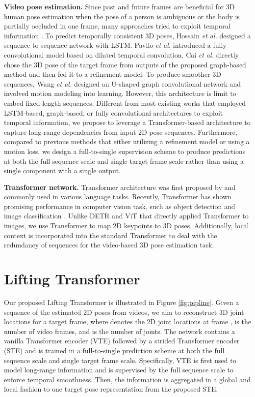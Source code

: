 \documentclass[10pt,twocolumn,letterpaper]{article}
\begin{document}
\textbf{Video pose estimation. }
Since past and future frames are beneficial for 3D human pose estimation when the pose of a person is ambiguous or the body is partially occluded in one frame, many approaches tried to exploit temporal information \cite{rayat2018exploiting,pavllo20193d,cai2019exploiting,wang2020motion}. 
To predict temporally consistent 3D poses, Hossain \emph{et al.} \cite{rayat2018exploiting} designed a sequence-to-sequence network with LSTM. 
Pavllo \emph{et al.} \cite{pavllo20193d} introduced a fully convolutional model based on dilated temporal convolution. 
Cai \emph{et al.} \cite{cai2019exploiting} directly chose the 3D pose of the target frame from outputs of the proposed graph-based method and then fed it to a refinement model. 
To produce smoother 3D sequences, Wang \emph{et al.} \cite{wang2020motion} designed an U-shaped graph convolutional network and involved motion modeling into learning. 
However, this architecture is limit to embed fixed-length sequences. 
Different from most existing works that employed LSTM-based, graph-based, or fully convolutional architectures to exploit temporal information, we propose to leverage a Transformer-based architecture to capture long-range dependencies from input 2D pose sequences. 
Furthermore, compared to previous methods \cite{cai2019exploiting,wang2020motion} that either utilizing a refinement model or using a motion loss, we design a full-to-single supervision scheme to produce predictions at both the full sequence scale and single target frame scale rather than using a single component with a single output. 

\textbf{Transformer network. }
Transformer architecture was first proposed by \cite{Attention} and commonly used in various language tasks. 
Recently, Transformer has shown promising performance in computer vision task, such as object detection \cite{carion2020end,zhu2020deformable} and image classification \cite{dosovitskiy2020image,yuan2021tokens}. 
Unlike DETR \cite{carion2020end} and ViT \cite{dosovitskiy2020image} that directly applied Transformer to images, we use Transformer to map 2D keypoints to 3D poses. 
Additionally, local context is incorporated into the standard Transformer to deal with the redundancy of sequences for the video-based 3D pose estimation task. 

\section{Lifting Transformer}
Our proposed Lifting Transformer is illustrated in Figure \ref{fig:pipline}. 
Given a sequence of the estimated 2D poses
 from videos, we aim to reconstruct 3D joint locations  for a target frame, where  denotes the 2D joint locations at frame ,  is the number of video frames, and  is the number of joints. 
The network contains a vanilla Transformer encoder (VTE) followed by a strided Transformer encoder (STE) and is trained in a full-to-single prediction scheme at both the full sequence scale and single target frame scale. 
Specifically, VTE is first used to model long-range information and is supervised by the full sequence scale to enforce temporal smoothness. 
Then, the information is aggregated in a global and local fashion to one target pose representation from the proposed STE.  
\end{document}
